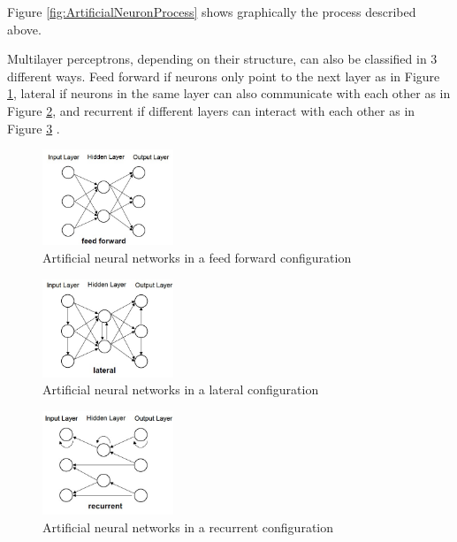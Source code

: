 \documentclass{article}
\begin{document}
\begin{doublespacing}
\par Figure \ref{fig:ArtificialNeuronProcess} shows graphically the process described above.

\par Multilayer perceptrons, depending on their structure, can also be classified in 3 different ways. Feed forward if neurons only point to the next layer as in Figure \ref{fig:FeedForward}, lateral if neurons in the same layer can also communicate with each other as in Figure \ref{fig:Lateral}, and recurrent if different layers can interact with each other as in Figure \ref{fig:Recurrent}  \cite{kaestner:SCANN}. 

\begin{figure}[H] 
    \centering
    \includegraphics[width=0.35\textwidth]{Images/FeedForward.JPG} 
    \caption{Artificial neural networks in a feed forward configuration \cite{kaestner:SCANN}} 
    \label{fig:FeedForward} 
\end{figure}

\begin{figure}[H] 
    \centering
    \includegraphics[width=0.35\textwidth]{Images/Lateral.JPG} 
    \caption{Artificial neural networks in a lateral configuration \cite{kaestner:SCANN}} 
    \label{fig:Lateral} 
\end{figure}

\begin{figure}[H] 
    \centering
    \includegraphics[width=0.35\textwidth]{Images/Recurrent.JPG} 
    \caption{Artificial neural networks in a recurrent configuration \cite{kaestner:SCANN}} 
    \label{fig:Recurrent} 
\end{figure}


\end{doublespacing}
\end{document}

